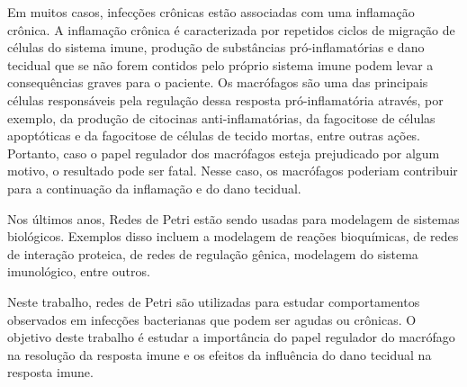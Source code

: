 \documentclass[a4paper,10pt]{article}
\begin{document}
		Em muitos casos, infecções crônicas estão associadas com uma inflamação crônica. A inflamação crônica é caracterizada por repetidos ciclos de migração 
		de células do sistema imune, produção de substâncias pró-inflamatórias e dano tecidual que se não forem contidos pelo próprio sistema imune podem levar a 
		consequências graves para o paciente. Os macrófagos são uma das principais células responsáveis pela regulação dessa resposta pró-inflamatória através, 
		por exemplo, da produção de citocinas anti-inflamatórias, da fagocitose de células apoptóticas e da fagocitose de células de tecido mortas, entre outras ações. 
		Portanto, caso o papel regulador dos macrófagos esteja prejudicado por algum motivo, o resultado pode ser fatal. 
		Nesse caso, os macrófagos poderiam contribuir para a continuação da inflamação e do dano tecidual. 

		Nos últimos anos, Redes de Petri estão sendo usadas para modelagem de sistemas biológicos. Exemplos disso incluem 
		a modelagem de reações bioquímicas, de redes de interação proteica, de redes de regulação gênica, 
		modelagem do sistema imunológico, entre outros. 
				
		Neste trabalho, redes de Petri são utilizadas para estudar comportamentos observados em infecções bacterianas que podem ser agudas ou crônicas.  
		O objetivo deste trabalho é estudar a importância do papel regulador do macrófago na resolução da resposta imune e os efeitos da influência do dano 
		tecidual na resposta imune. 		
				
		
\end{document}
